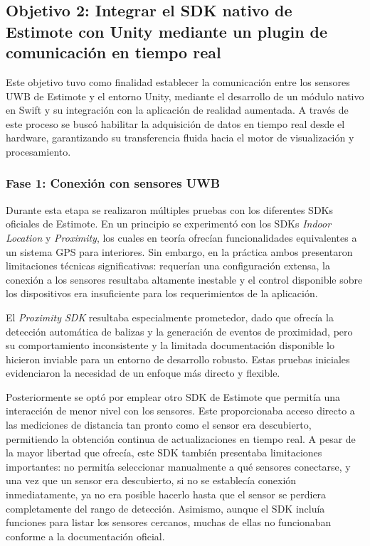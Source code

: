 \subsection{Objetivo 2: Integrar el SDK nativo de Estimote con Unity mediante un plugin de comunicación en tiempo real}
Este objetivo tuvo como finalidad establecer la comunicación entre los sensores UWB de Estimote y el entorno Unity, mediante el desarrollo de un módulo nativo en Swift y su integración con la aplicación de realidad aumentada. A través de este proceso se buscó habilitar la adquisición de datos en tiempo real desde el hardware, garantizando su transferencia fluida hacia el motor de visualización y procesamiento.

\subsubsection*{Fase 1: Conexión con sensores UWB}

Durante esta etapa se realizaron múltiples pruebas con los diferentes SDKs oficiales de Estimote. En un principio se experimentó con los SDKs \textit{Indoor Location} y \textit{Proximity}, los cuales en teoría ofrecían funcionalidades equivalentes a un sistema GPS para interiores. Sin embargo, en la práctica ambos presentaron limitaciones técnicas significativas: requerían una configuración extensa, la conexión a los sensores resultaba altamente inestable y el control disponible sobre los dispositivos era insuficiente para los requerimientos de la aplicación. 

El \textit{Proximity SDK} resultaba especialmente prometedor, dado que ofrecía la detección automática de balizas y la generación de eventos de proximidad, pero su comportamiento inconsistente y la limitada documentación disponible lo hicieron inviable para un entorno de desarrollo robusto. Estas pruebas iniciales evidenciaron la necesidad de un enfoque más directo y flexible.

Posteriormente se optó por emplear otro SDK de Estimote que permitía una interacción de menor nivel con los sensores. Este proporcionaba acceso directo a las mediciones de distancia tan pronto como el sensor era descubierto, permitiendo la obtención continua de actualizaciones en tiempo real. A pesar de la mayor libertad que ofrecía, este SDK también presentaba limitaciones importantes: no permitía seleccionar manualmente a qué sensores conectarse, y una vez que un sensor era descubierto, si no se establecía conexión inmediatamente, ya no era posible hacerlo hasta que el sensor se perdiera completamente del rango de detección. Asimismo, aunque el SDK incluía funciones para listar los sensores cercanos, muchas de ellas no funcionaban conforme a la documentación oficial.


